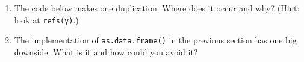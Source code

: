 \begin{enumerate}
\def\labelenumi{\arabic{enumi}.}
\item
  The code below makes one duplication. Where does it occur and why?
  (Hint: look at \texttt{refs(y)}.)

\begin{Shaded}
\begin{Highlighting}[]
\StringTok{ }
  \StringTok{ }\StringTok{ }
\NormalTok{\}}
\end{Highlighting}
\end{Shaded}
\item
  The implementation of \texttt{as.data.frame()} in the previous section
  has one big downside. What is it and how could you avoid it?
\end{enumerate}
